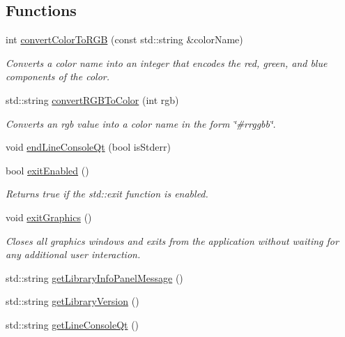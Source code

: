 \subsection*{Functions}
\begin{DoxyCompactItemize}
\item 
int \mbox{\hyperlink{namespacesgl_aab4a1480d396f913220aea51d117eb94}{convert\+Color\+To\+R\+GB}} (const std\+::string \&color\+Name)
\begin{DoxyCompactList}\small\item\em Converts a color name into an integer that encodes the red, green, and blue components of the color. \end{DoxyCompactList}\item 
std\+::string \mbox{\hyperlink{namespacesgl_a64353dd79967412aeebe46219e4a71df}{convert\+R\+G\+B\+To\+Color}} (int rgb)
\begin{DoxyCompactList}\small\item\em Converts an {\ttfamily rgb} value into a color name in the form {\ttfamily \char`\"{}\#rrggbb\char`\"{}}. \end{DoxyCompactList}\item 
void \mbox{\hyperlink{namespacesgl_aa860978c1abc72823f943acd03b2cb26}{end\+Line\+Console\+Qt}} (bool is\+Stderr)
\item 
bool \mbox{\hyperlink{namespacesgl_a5bb1fbda6b82680cc8f04064e55a85c6}{exit\+Enabled}} ()
\begin{DoxyCompactList}\small\item\em Returns true if the std\+::exit function is enabled. \end{DoxyCompactList}\item 
void \mbox{\hyperlink{namespacesgl_a9a92c5a4ea24cb583276ed5abbbfdf81}{exit\+Graphics}} ()
\begin{DoxyCompactList}\small\item\em Closes all graphics windows and exits from the application without waiting for any additional user interaction. \end{DoxyCompactList}\item 
std\+::string \mbox{\hyperlink{namespacesgl_a1ddb4527643468187978f5732f306ee8}{get\+Library\+Info\+Panel\+Message}} ()
\item 
std\+::string \mbox{\hyperlink{namespacesgl_acfe02dedce4026ebabe4a4e4806795ab}{get\+Library\+Version}} ()
\item 
std\+::string \mbox{\hyperlink{namespacesgl_ac9d3e41f643b89ff2ecbe0afc84072af}{get\+Line\+Console\+Qt}} ()
\item 

\end{DoxyCompactItemize}

